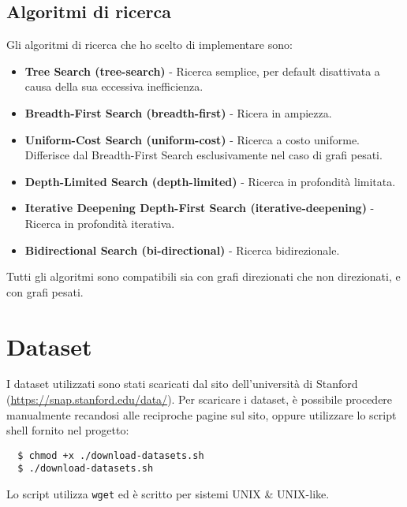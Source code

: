 \documentclass{article}
\begin{document}
\subsection{Algoritmi di ricerca}
Gli algoritmi di ricerca che ho scelto di implementare sono:
\begin{itemize}
	\item \textbf{Tree Search (tree-search)} - Ricerca semplice, per default disattivata a causa della sua eccessiva inefficienza.
	\item \textbf{Breadth-First Search (breadth-first)} - Ricera in ampiezza.
	\item \textbf{Uniform-Cost Search (uniform-cost)} - Ricerca a costo uniforme. Differisce dal Breadth-First Search esclusivamente nel caso di grafi pesati.
	\item \textbf{Depth-Limited Search (depth-limited)} - Ricerca in profondità limitata.
	\item \textbf{Iterative Deepening Depth-First Search (iterative-deepening)} - Ricerca in profondità iterativa.
	\item \textbf{Bidirectional Search (bi-directional)} - Ricerca bidirezionale.
\end{itemize}

Tutti gli algoritmi sono compatibili sia con grafi direzionati che non direzionati, e con grafi pesati.

\section{Dataset}\label{sec:dataset}
I dataset utilizzati sono stati scaricati dal sito dell'università di Stanford (\url{https://snap.stanford.edu/data/}).
Per scaricare i dataset, è possibile procedere manualmente recandosi alle reciproche pagine sul sito, oppure utilizzare lo script shell fornito nel progetto:
\begin{lstlisting}
  $ chmod +x ./download-datasets.sh
  $ ./download-datasets.sh
\end{lstlisting}
Lo script utilizza \texttt{wget} ed è scritto per sistemi UNIX \& UNIX-like.
\end{document}
